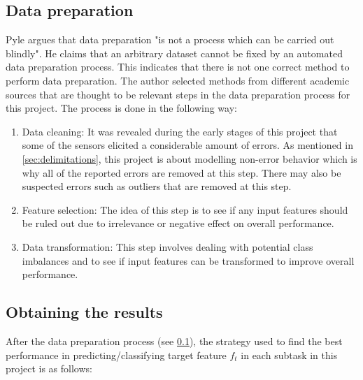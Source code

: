 	\subsection{Data preparation} \label{sec:method_dataprep}
		Pyle \cite{BOOK:15} argues that data preparation "is not a process which can be carried out blindly". He claims that an arbitrary dataset cannot be fixed by an automated data preparation process. This indicates that there is not one correct method to perform data preparation. The author selected methods from different academic sources \cite{BOOK:15, BOOK:16, BOOK:17} that are thought to be relevant steps in the data preparation process for this project. The process is done in the following way:
	\begin{enumerate}
		\item{Data cleaning: } It was revealed during the early stages of this project that some of the sensors elicited a considerable amount of errors. As mentioned in \ref{sec:delimitations}, this project is about modelling non-error behavior which is why all of the reported errors are removed at this step. There may also be suspected errors such as outliers that are removed at this step.
		\item{Feature selection: } The idea of this step is to see if any input features should be ruled out due to irrelevance or negative effect on overall performance.
		\item{Data transformation: } This step involves dealing with potential class imbalances and to see if input features can be transformed to improve overall performance.
	\end{enumerate}

	\subsection{Obtaining the results} \label{sec:method_results}
			After the data preparation process (see \ref{sec:method_dataprep}), the strategy used to find the best performance in predicting/classifying target feature $f_t$ in each subtask in this project is as follows:

